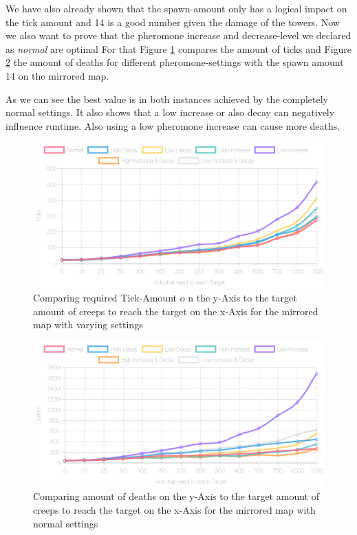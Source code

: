 We have also already shown that the spawn-amount only has a logical impact on the tick amount and 14 is a good number given the damage of the towers. Now we also want to prove that the pheromone increase and decrease-level we declared as \textit{normal} are optimal
For that Figure \ref{fig:diffsettings2} compares the amount of ticks and Figure \ref{fig:diffsetting2sdeath} the amount of deaths for different pheromone-settings with the spawn amount 14 on the mirrored map.

As we can see the best value is in both instances achieved by the completely normal settings. It also shows that a low increase or also decay can negatively influence runtime. Also using a low pheromone increase can cause more deaths.

\begin{figure}[H]
  \centering
  \includegraphics[width=1\linewidth]{images/mirrorednormalpheromticks}
  \caption{Comparing required Tick-Amount o n the y-Axis to the target amount of creeps to reach the target on the x-Axis for the mirrored map with varying settings}
  \label{fig:diffsettings2}
\end{figure}

\begin{figure}[H]
  \centering
  \includegraphics[width=1\linewidth]{images/mirroredwittowerdeaths}
  \caption{Comparing amount of deaths on the y-Axis to the target amount of creeps to reach the target on the x-Axis for the mirrored map with normal settings}
  \label{fig:diffsetting2sdeath}
\end{figure}